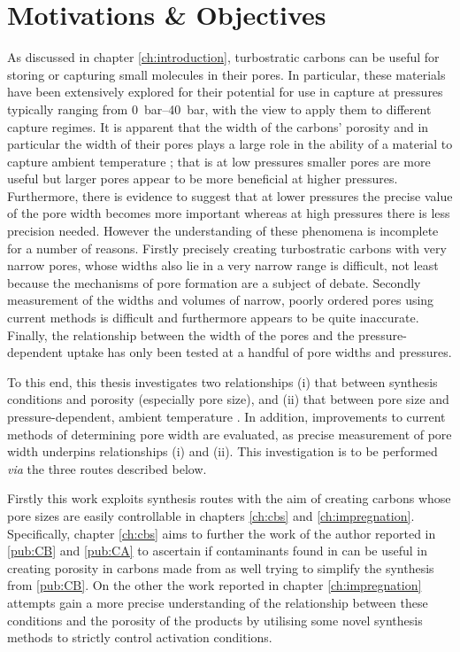\chapter{Motivations \& Objectives}
\label{ch:motivations_objectives} 

As discussed in chapter \ref{ch:introduction}, \glspl{turbostratic carbon} can be useful for storing or capturing small molecules in their pores. In particular, these materials have been extensively explored for their potential for use in  capture at pressures typically ranging from \qtyrange{0}{40}{\bar}, with the view to apply them to different  capture regimes. It is apparent that the width of the carbons' porosity and in particular the width of their pores plays a large role in the ability of a material to capture ambient temperature ; that is at low pressures smaller pores are more useful but larger pores appear to be more beneficial at higher pressures. Furthermore, there is evidence to suggest that at lower pressures the precise value of the pore width becomes more important whereas at high pressures there is less precision needed. However the understanding of these phenomena is incomplete for a number of reasons. Firstly precisely creating \glspl{turbostratic carbon} with very narrow pores, whose widths also lie in a very narrow range is difficult, not least because the mechanisms of pore formation are a subject of debate. Secondly measurement of the widths and volumes of narrow, poorly ordered pores using current methods is difficult and furthermore appears to be quite inaccurate. Finally, the relationship between the width of the pores and the pressure-dependent  uptake has only been tested at a handful of pore widths and pressures.  

To this end, this thesis investigates two relationships (i) that between synthesis conditions and porosity (especially pore size), and (ii) that between pore size and pressure-dependent, ambient temperature . In addition, improvements to current methods of determining pore width are evaluated, as precise measurement of pore width underpins relationships (i) and (ii). This investigation is to be performed \textit{via} the three routes described below.

Firstly this work exploits synthesis routes with the aim of creating carbons whose pore sizes are easily controllable in chapters \ref{ch:cbs} and \ref{ch:impregnation}. Specifically, chapter \ref{ch:cbs} aims to further the work of the author reported in \ref{pub:CB} and \ref{pub:CA} to ascertain if contaminants found in  can be useful in creating porosity in carbons made from  as well trying to simplify the synthesis from \ref{pub:CB}. On the other the work reported in chapter \ref{ch:impregnation} attempts gain a more precise understanding of the relationship between these conditions and the porosity of the products by utilising some novel synthesis methods to strictly control activation conditions. 

